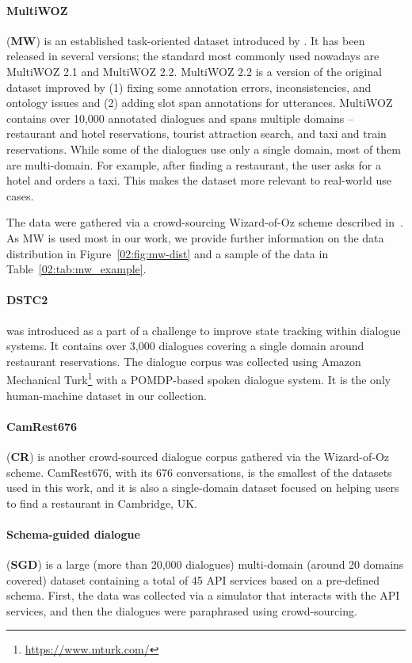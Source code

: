 \paragraph{MultiWOZ} (\textbf{MW}) is an established task-oriented dataset introduced by \citet{budzianowski-etal-2018-multiwoz}.
It has been released in several versions; the standard most commonly used nowadays are MultiWOZ 2.1 and MultiWOZ 2.2.
MultiWOZ 2.2 is a version of the original dataset improved by (1) fixing some annotation errors, inconsistencies, and ontology issues and (2) adding slot span annotations for utterances.
MultiWOZ contains over 10,000 annotated dialogues and spans multiple domains -- restaurant and hotel reservations, tourist attraction search, and taxi and train reservations.
While some of the dialogues use only a single domain, most of them are multi-domain.
For example, after finding a restaurant, the user asks for a hotel and orders a taxi.
This makes the dataset more relevant to real-world use cases.

The data were gathered via a crowd-sourcing Wizard-of-Oz scheme described in~\citet{wen-etal-2017-wizard-of-oz}.
As MW is used most in our work, we provide further information on the data distribution in Figure~\ref{02:fig:mw-dist} and a sample of the data in Table~\ref{02:tab:mw_example}.

\paragraph{DSTC2} \cite{henderson_robust_2014} was introduced as a part of a challenge to improve state tracking within dialogue systems. It contains over 3,000 dialogues covering a single domain around restaurant reservations. The dialogue corpus was collected using Amazon Mechanical Turk\footnote{\url{https://www.mturk.com/}} with a POMDP-based spoken dialogue system. It is the only human-machine dataset in our collection.

\paragraph{CamRest676} (\textbf{CR}) \cite{wen2016network} is another crowd-sourced dialogue corpus gathered via the Wizard-of-Oz scheme. CamRest676, with its 676 conversations, is the smallest of the datasets used in this work, and it is also a single-domain dataset focused on helping users to find a restaurant in Cambridge, UK. 

\paragraph{Schema-guided dialogue} (\textbf{SGD}) is a large (more than 20,000 dialogues) multi-domain (around 20 domains covered) dataset containing a total of 45 API services based on a pre-defined schema. First, the data was collected via a simulator that interacts with the API services, and then the dialogues were paraphrased using crowd-sourcing. \\

